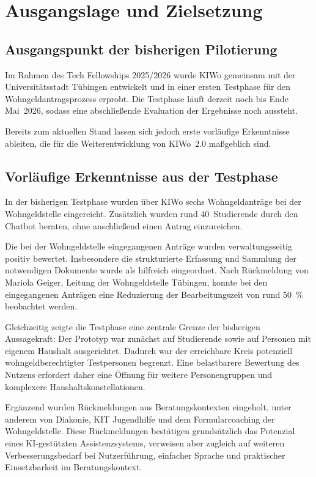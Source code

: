 \chapter{Ausgangslage und Zielsetzung}

\section{Ausgangspunkt der bisherigen Pilotierung}

Im Rahmen des Tech Fellowships 2025/2026 wurde KIWo gemeinsam mit der
Universitätsstadt Tübingen entwickelt und in einer ersten Testphase für den
Wohngeldantragsprozess erprobt. Die Testphase läuft derzeit noch bis Ende
Mai~2026, sodass eine abschließende Evaluation der Ergebnisse noch aussteht.

Bereits zum aktuellen Stand lassen sich jedoch erste vorläufige Erkenntnisse
ableiten, die für die Weiterentwicklung von KIWo~2.0 maßgeblich sind.

\section{Vorläufige Erkenntnisse aus der Testphase}

In der bisherigen Testphase wurden über KIWo sechs Wohngeldanträge bei der
Wohngeldstelle eingereicht. Zusätzlich wurden rund 40~Studierende durch den
Chatbot beraten, ohne anschließend einen Antrag einzureichen.

Die bei der Wohngeldstelle eingegangenen Anträge wurden verwaltungsseitig
positiv bewertet. Insbesondere die strukturierte Erfassung und Sammlung der
notwendigen Dokumente wurde als hilfreich eingeordnet. Nach Rückmeldung von
Mariola Geiger, Leitung der Wohngeldstelle Tübingen, konnte bei den
eingegangenen Anträgen eine Reduzierung der Bearbeitungszeit von rund
50~\% beobachtet werden.

Gleichzeitig zeigte die Testphase eine zentrale Grenze der bisherigen
Aussagekraft: Der Prototyp war zunächst auf Studierende sowie auf Personen
mit eigenem Haushalt ausgerichtet. Dadurch war der erreichbare Kreis
potenziell wohngeldberechtigter Testpersonen begrenzt. Eine belastbarere
Bewertung des Nutzens erfordert daher eine Öffnung für weitere
Personengruppen und komplexere Haushaltskonstellationen.

Ergänzend wurden Rückmeldungen aus Beratungskontexten eingeholt, unter
anderem von Diakonie, KIT Jugendhilfe und dem Formularcoaching der
Wohngeldstelle. Diese Rückmeldungen bestätigen grundsätzlich das Potenzial
eines KI-gestützten Assistenzsystems, verweisen aber zugleich auf weiteren
Verbesserungsbedarf bei Nutzerführung, einfacher Sprache und praktischer
Einsetzbarkeit im Beratungskontext.

